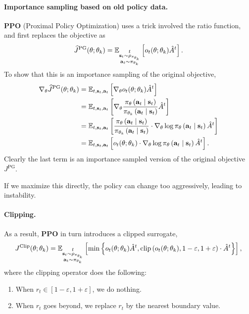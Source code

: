 \documentclass[11pt]{article}  %
\begin{document}
\paragraph{Importance sampling based on old policy data.} \textbf{PPO} (Proximal Policy Optimization) uses a trick involved the ratio function, and first replaces the objective as 
\begin{align*}
  \widehat{J}^{\text{PG}}(\theta; \theta_k) = \mathbb{E}_{ \substack{t \\ \mathbf{s}_t \sim \rho_{\pi_{\theta_k}} \\ \mathbf{a}_t \sim \pi_{\theta_k}}}\left[o_t(\theta; \theta_k) \hat{A}^t\right].
\end{align*} 
To show that this is an importance sampling of the original objective, 
\begin{align*}
  \nabla_\theta \widehat{J}^{\text{PG}}(\theta; \theta_k) &= \mathbb{E}_{t, \mathbf{s}_t, \mathbf{a}_t}\left[\nabla_\theta o_t(\theta; \theta_k) \hat{A}^t\right] \\
  &= \mathbb{E}_{t, \mathbf{s}_t, \mathbf{a}_t}\left[\nabla_\theta \frac{\pi_{\theta}\left( \mathbf{a}_t \mid \mathbf{s}_t \right)}{\pi_{\theta_{k}}\left( \mathbf{a}_t \mid \mathbf{s}_t \right)} \hat{A}^t\right] \\
  &= \mathbb{E}_{t, \mathbf{s}_t, \mathbf{a}_t}\left[\frac{\pi_{\theta}\left( \mathbf{a}_t \mid \mathbf{s}_t \right)}{\pi_{\theta_{k}}\left( \mathbf{a}_t \mid \mathbf{s}_t \right)}\cdot \nabla_\theta\log \pi_{\theta}\left( \mathbf{a}_t \mid \mathbf{s}_t \right) \hat{A}^t\right] \\
  &= \mathbb{E}_{t, \mathbf{s}_t, \mathbf{a}_t}\left[o_t(\theta; \theta_k)\cdot \nabla_\theta\log \pi_{\theta}\left( \mathbf{a}_t \mid \mathbf{s}_t \right) \hat{A}^t\right].
\end{align*}
Clearly the last term is an importance sampled version of the original objective $J^{\text{PG}}$.

If we maximize this directly, the policy can change too aggressively, leading to instability.

\paragraph{Clipping.} As a result, \textbf{PPO} in turn introduces a clipped surrogate,
\begin{align*}
  J^{\text{Clip}}(\theta; \theta_k) = \mathbb{E}_{\substack{t \\ \mathbf{s}_t \sim \rho_{\pi_{\theta_k}} \\ \mathbf{a}_t \sim \pi_{\theta_k}}}\left[\min\left\{ o_t(\theta; \theta_k) \hat{A}^t, \text{clip}\left( o_t(\theta; \theta_k), 1-\varepsilon, 1+\varepsilon \right)\cdot\hat{A}^t \right\}\right],
\end{align*}
where the clipping operator does the following:
\begin{enumerate}
  \item When $r_t \in [1 - \varepsilon, 1 + \varepsilon]$, we do nothing.
  \item When $r_t$ goes beyond, we replace $r_t$ by the nearest boundary value.
\end{enumerate}
\end{document}
